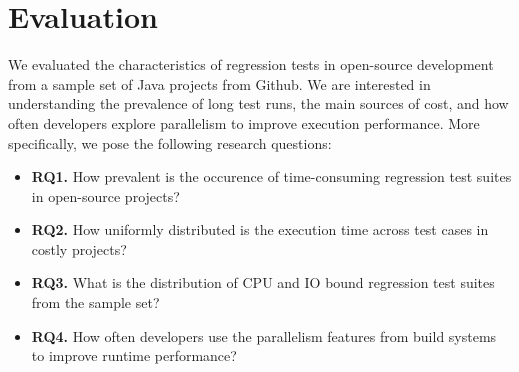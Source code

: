 \section{Evaluation}
\label{sec:eval}


We evaluated the characteristics of regression tests in open-source
development from a sample set of Java projects from
Github. We are interested in understanding the prevalence
of long test runs, the main sources of cost, and how often developers
explore parallelism to improve execution performance. More
specifically, we pose the following research questions:

\newcommand{\RQA}{How prevalent is the occurence of time-consuming
regression test suites in open-source projects?}

\newcommand{\RQB}{What is the distribution of CPU and IO bound
regression test suites from the sample set?}

\newcommand{\RQC}{How uniformly distributed is the execution time
across test cases in costly projects?}

\newcommand{\RQD}{How often developers use the parallelism features
from build systems to improve runtime performance?}

\newcommand{\rqOne}{\textbf{RQ1.} \RQA}
\newcommand{\rqTwo}{\textbf{RQ2.} \RQC}
\newcommand{\rqThree}{\textbf{RQ3.} \RQB}
\newcommand{\rqFour}{\textbf{RQ4.} \RQD}

\begin{itemize}
    \item \rqOne
    \item \rqTwo
    \item \rqThree
    \item \rqFour
\end{itemize}

